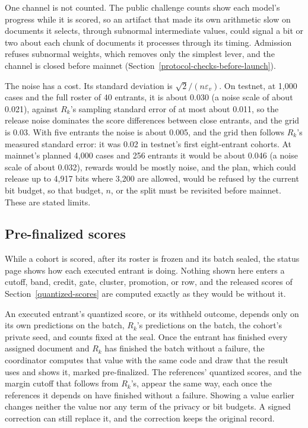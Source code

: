 One channel is not counted. The public challenge counts show each model's
progress while it is scored, so an artifact that made its own arithmetic slow
on documents it selects, through subnormal intermediate values, could signal a
bit or two about each chunk of documents it processes through its timing.
Admission refuses subnormal weights, which removes only the simplest lever, and
the channel is closed before mainnet
(Section~\ref{protocol-checks-before-launch}).

The noise has a cost. Its standard deviation is \(\sqrt2/(n\varepsilon_v)\). On
testnet, at 1,000 cases and the full roster of 40 entrants, it is about 0.030
(a noise scale of about 0.021), against \(R_k\)'s sampling standard error of
at most about 0.011, so the release noise dominates the score differences
between close entrants, and the grid is 0.03. With five entrants the noise is
about 0.005, and the grid then follows \(R_k\)'s measured standard error: it
was 0.02 in testnet's first eight-entrant cohorts. At
mainnet's planned 4,000 cases and 256 entrants it would be about 0.046 (a noise
scale of about 0.032), rewards would be mostly noise, and
the plan, which could release up to 4,917 bits where 3,200 are allowed, would
be refused by the current bit budget, so that budget, \(n\), or the split
must be revisited before mainnet. These are stated limits.

\subsection{Pre-finalized scores}\label{pre-finalized-scores}

While a cohort is scored, after its roster is frozen and its batch sealed, the
status page shows how each executed entrant is doing. Nothing shown here enters
a cutoff, band, credit, gate, cluster, promotion, or row, and the released
scores of Section~\ref{quantized-scores} are computed exactly as they would be
without it.

An executed entrant's quantized score, or its withheld outcome, depends only on
its own predictions on the batch, \(R_k\)'s predictions on the batch, the
cohort's private seed, and counts fixed at the seal. Once the entrant has
finished every assigned document and \(R_k\) has finished the batch without a
failure, the coordinator computes that value with the same code and draw that
the result uses and shows it, marked pre-finalized. The references' quantized
scores, and the margin cutoff that follows from \(R_k\)'s, appear the same way,
each once the references it depends on have finished without a failure.
Showing a value earlier changes neither the value nor any term of the privacy
or bit budgets. A signed correction can still replace it, and the correction
keeps the original record.

